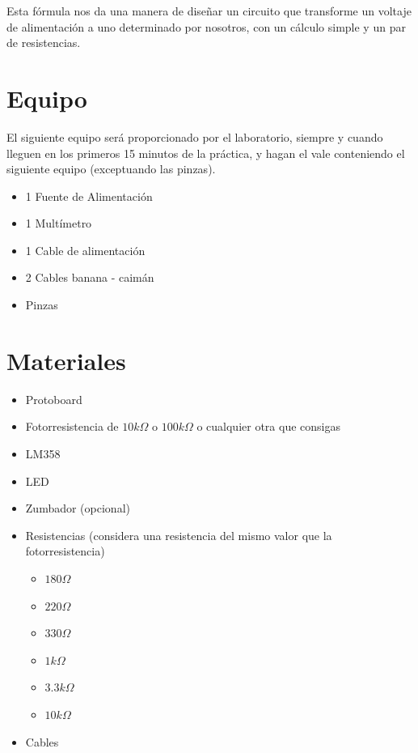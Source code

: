 		Esta fórmula nos da una manera de diseñar un circuito que transforme un voltaje de alimentación a uno determinado por nosotros, con un cálculo simple y un par de resistencias.


\section{Equipo}

	El siguiente equipo será proporcionado por el laboratorio, siempre y cuando lleguen en los primeros 15 minutos de la práctica, y hagan el vale conteniendo el siguiente equipo (exceptuando las pinzas).

	\begin{itemize}
		\item 1 Fuente de Alimentación
		\item 1 Multímetro
		\item 1 Cable de alimentación
		\item 2 Cables banana - caimán
		\item Pinzas
	\end{itemize}


\section{Materiales}

	\begin{itemize}
		\item Protoboard
		\item Fotorresistencia de $10 k \Omega$ o $100 k \Omega$ o cualquier otra que consigas
		\item LM358
		\item LED
		\item Zumbador (opcional)
		\item Resistencias (considera una resistencia del mismo valor que la fotorresistencia)
		\begin{itemize}
			\item $180 \Omega$
			\item $220 \Omega$
			\item $330 \Omega$
			\item $1 k\Omega$
			\item $3.3 k\Omega$
			\item $10 k\Omega$
		\end{itemize}
		\item Cables
	\end{itemize}

